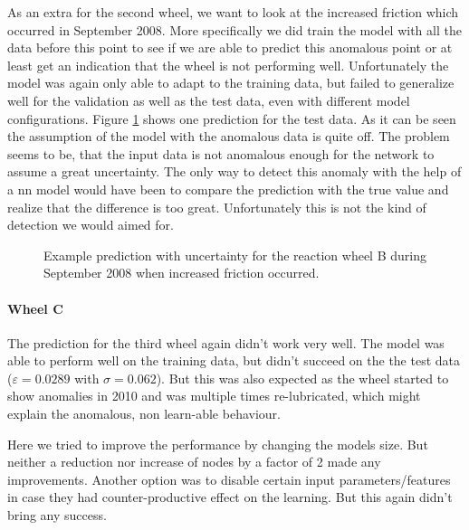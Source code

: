 		As an extra for the second wheel, we want to look at the increased friction which occurred in September 2008. More specifically we did train the model with all the data before this point to see if we are able to predict this anomalous point or at least get an indication that the wheel is not performing well. \newline
		Unfortunately the model was again only able to adapt to the training data, but failed to generalize well for the validation as well as the test data, even with different model configurations. Figure \ref{f:rwb_prediction_example} shows one prediction for the test data. As it can be seen the assumption of the model with the anomalous data is quite off. The problem seems to be, that the input data is not anomalous enough for the network to assume a great uncertainty. \newline
		The only way to detect this anomaly with the help of a \ac{nn} model would have been to compare the prediction with the true value and realize that the difference is too great. Unfortunately this is not the kind of detection we would aimed for.
		
		
		\begin{figure}[htb]
		\centering
		
		\caption{Example prediction with uncertainty for the reaction wheel B during September 2008 when increased friction occurred.}
		\label{f:rwb_prediction_example}
		\end{figure}
			
		\paragraph*{Wheel C} \hfill
		
		The prediction for the third wheel again didn't work very well. The model was able to perform well on the training data, but didn't succeed on the the test data ($\varepsilon = 0.0289$ with $\sigma = 0.062$). But this was also expected as the wheel started to show anomalies in 2010 and was multiple times re-lubricated, which might explain the anomalous, non learn-able behaviour.
		
		Here we tried to improve the performance by changing the models size. But neither a reduction nor increase of nodes by a factor of 2 made any improvements. \newline
		Another option was to disable certain input parameters/features in case they had counter-productive effect on the learning. But this again didn't bring any success.
			
